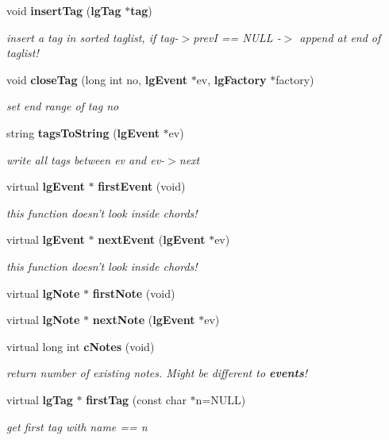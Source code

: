 \begin{CompactItemize}
void {\bf insert\-Tag} ({\bf lg\-Tag} $\ast${\bf tag})
\begin{CompactList}\small\item\em insert a tag in sorted taglist, if tag-$>$prev\-I == NULL -$>$ append at end of taglist! \item\end{CompactList}\item 
void {\bf close\-Tag} (long int no, {\bf lg\-Event} $\ast$ev, {\bf lg\-Factory} $\ast$factory)
\begin{CompactList}\small\item\em set end range of tag no \item\end{CompactList}\item 
string {\bf tags\-To\-String} ({\bf lg\-Event} $\ast$ev)
\begin{CompactList}\small\item\em write all tags between ev and ev-$>$next \item\end{CompactList}\item 
virtual {\bf lg\-Event} $\ast$ {\bf first\-Event} (void)
\begin{CompactList}\small\item\em this function doesn't look inside chords! \item\end{CompactList}\item 
virtual {\bf lg\-Event} $\ast$ {\bf next\-Event} ({\bf lg\-Event} $\ast$ev)
\begin{CompactList}\small\item\em this function doesn't look inside chords! \item\end{CompactList}\item 
virtual {\bf lg\-Note} $\ast$ {\bf first\-Note} (void)
\item 
virtual {\bf lg\-Note} $\ast$ {\bf next\-Note} ({\bf lg\-Event} $\ast$ev)
\item 
virtual long int {\bf c\-Notes} (void)
\begin{CompactList}\small\item\em return number of existing notes. Might be different to {\bf events}! \item\end{CompactList}\item 
virtual {\bf lg\-Tag} $\ast$ {\bf first\-Tag} (const char $\ast$n=NULL)
\begin{CompactList}\small\item\em get first tag with name == n \item\end{CompactList}\item 

\end{CompactItemize}
